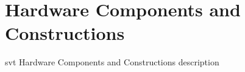 \section{Hardware Components and Constructions}

svt Hardware Components and Constructions description

